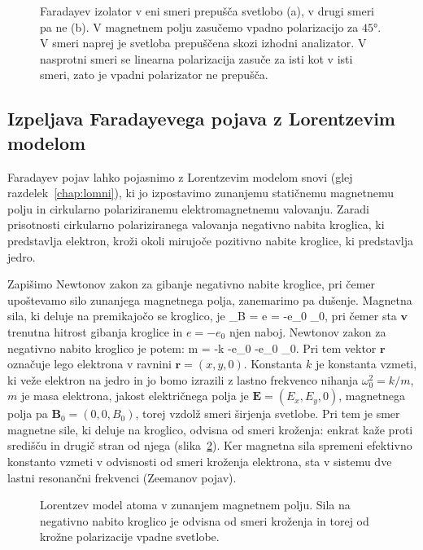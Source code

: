 \begin{figure}[h]
\centering
\def\svgwidth{100truemm} 

\caption{Faradayev izolator v eni smeri prepušča svetlobo (a), v drugi smeri pa ne (b).
V magnetnem polju zasučemo vpadno polarizacijo za $45\si{\degree}$. V smeri naprej je
svetloba prepuščena skozi izhodni analizator. V nasprotni smeri se linearna polarizacija
zasuče za isti kot v isti smeri, zato je vpadni polarizator ne prepušča.}
\label{fig:09_izolator}
\end{figure}

\subsection*{Izpeljava Faradayevega pojava z Lorentzevim modelom}
Faradayev pojav lahko pojasnimo z Lorentzevim modelom snovi 
(glej razdelek~\ref{chap:lomni}), ki jo izpostavimo zunanjemu 
statičnemu magnetnemu polju in cirkularno polariziranemu
elektro\-magnetnemu valovanju. Zaradi prisotnosti cirkularno 
polariziranega valovanja negativno nabita kroglica, ki predstavlja elektron, 
kroži okoli mirujoče pozitivno nabite kroglice, ki predstavlja jedro. 

Zapišimo Newtonov zakon za gibanje negativno nabite kroglice,
pri čemer upoštevamo silo zunanjega magnetnega polja, zanemarimo pa dušenje. 
Magnetna sila, ki deluje na premikajočo se kroglico, je 
\beq
{}_B = e \times {} = -e_0 \times {}_0,
\label{eq:09_52}
\eeq
pri čemer sta $\mathbf{v}$ trenutna hitrost gibanja kroglice in $e = -e_0$
njen naboj. Newtonov zakon za negativno nabito kroglico je potem:
\beq
m = -k -e_0  -e_0 \times {}_0.
\label{eq:09_55}
\eeq
Pri tem vektor $\mathbf{r}$ označuje lego elektrona v ravnini $\mathbf{r} = (x,y,0)$. Konstanta
$k$ je konstanta vzmeti, ki veže elektron na jedro in  jo bomo izrazili z lastno frekvenco 
nihanja $\omega_0^2 = k/m$, $m$ je masa elektrona, jakost električnega polja je $\mathbf{E} = (E_x, E_y, 0)$,
magnetnega polja pa $\mathbf{B}_0 = (0,0,B_0)$, torej vzdolž smeri širjenja svetlobe. 
Pri tem je smer magnetne sile, ki deluje na kroglico, odvisna od smeri kroženja: 
enkrat kaže proti središču in drugič stran od njega (slika~\ref{fig:09_LorentzB}).
Ker magnetna sila spremeni
efektivno konstanto vzmeti v odvisnosti od smeri kroženja elektrona, sta v sistemu
dve lastni resonančni frekvenci (Zeemanov pojav).
\begin{figure}[ht]
\centering
\def\svgwidth{110truemm} 

\caption{Lorentzev model atoma v zunanjem magnetnem polju. Sila na negativno 
nabito kroglico je odvisna od smeri kroženja in torej od krožne polarizacije vpadne svetlobe.
}
\label{fig:09_LorentzB}
\end{figure}


